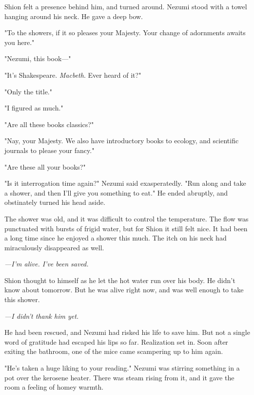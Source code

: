 
Shion felt a presence behind him, and turned around. Nezumi stood with a
towel hanging around his neck. He gave a deep bow.

"To the showers, if it so pleases your Majesty. Your change of
adornments awaits you here."

"Nezumi, this book---"

"It's Shakespeare. \emph{Macbeth}. Ever heard of it?"

"Only the title."

"I figured as much."

"Are all these books classics?"

"Nay, your Majesty. We also have introductory books to ecology, and
scientific journals to please your fancy."

"Are these all your books?"

"Is it interrogation time again?" Nezumi said exasperatedly. "Run along
and take a shower, and then I'll give you something to eat." He ended
abruptly, and obstinately turned his head aside.

\myspace

The shower was old, and it was difficult to control the temperature. The
flow was punctuated with bursts of frigid water, but for Shion it still
felt nice. It had been a long time since he enjoyed a shower this much.
The itch on his neck had miraculously disappeared as well.

\emph{---I'm alive. I've been saved.}

Shion thought to himself as he let the hot water run over his body. He
didn't know about tomorrow. But he was alive right now, and was well
enough to take this shower.

\emph{---I didn't thank him yet.}

He had been rescued, and Nezumi had risked his life to save him. But not
a single word of gratitude had escaped his lips so far. Realization set
in. Soon after exiting the bathroom, one of the mice came scampering up
to him again.

"He's taken a huge liking to your reading." Nezumi was stirring
something in a pot over the kerosene heater. There was steam rising from
it, and it gave the room a feeling of homey warmth.

